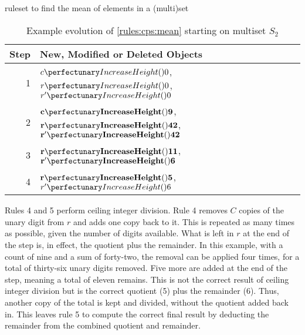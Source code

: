 \begin{cprulesetfloat}
\begin{cpruleset}




\end{cpruleset}
\caption{\label{rules:cps:mean}\Gls{ruleset} to find the mean of elements in a (multi)set}
\end{cprulesetfloat}

\begin{table} \centering
  \begin{tabular}{|r|l|}
    \hline
    \textbf{Step} & \textbf{New, Modified or Deleted Objects} \\ \hline
    1 & \(\cpfunc{c}{0}\), \(\cpfunc{r}{0}\), \(\cpfunc{r'}{0}\)\\ \hline
    2 & \(\mathbf{\cpfunc{c}{9}}\), \(\mathbf{\cpfunc{r}{42}}\), \(\mathbf{\cpfunc{r'}{42}}\)\\ \hline
    3 & \(\mathbf{\cpfunc{r}{11}}\), \(\mathbf{\cpfunc{r'}{6}}\)\\ \hline
    4 & \(\mathbf{\cpfunc{r}{5}}\), \sout{\(\cpfunc{r'}{6}\)}\\ \hline

\end{tabular}
\caption[Example evolution of \cref{rules:cps:mean}]{\label{tab:cps:mean}Example evolution of \cref{rules:cps:mean} starting on multiset \(S_2\)}
\end{table}

Rules 4 and 5 perform ceiling integer division.  Rule 4 removes \(C\) copies of the unary digit from \(r\) and adds one copy back to it.  This is repeated as many times as possible, given the number of digits available.  What is left in \(r\) at the end of the step is, in effect, the quotient plus the remainder.  In this example, with a count of nine and a sum of forty-two, the removal can be applied four times, for a total of thirty-six unary digits removed.  Five more are added at the end of the step, meaning a total of eleven remains.  This is not the correct result of ceiling integer division but is the correct quotient (5) plus the remainder (6).  Thus, another copy of the total is kept and divided, without the quotient added back in.  This leaves rule 5 to compute the correct final result by deducting the remainder from the combined quotient and remainder.

